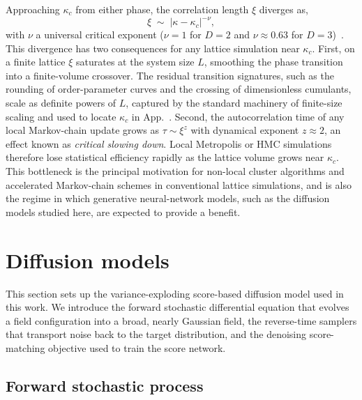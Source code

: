 \documentclass[reprint,twocolumn,superscriptaddress,preprintnumbers,amsmath,amssymb,aps,prd,floatfix]{revtex4-2}
\def\App#1{App.~\labelcref{#1}}
\begin{document}
Approaching $\kappa_c$ from either phase, the correlation length $\xi$ diverges as,
\begin{equation}
\xi \;\sim\; |\kappa-\kappa_c|^{-\nu},
\label{eq:xi_scaling}
\end{equation}
with $\nu$ a universal critical exponent ($\nu=1$ for $D=2$ and $\nu\approx 0.63$ for $D=3$)~\cite{Kleinert:2001ax}. This divergence has two consequences for any lattice simulation near $\kappa_c$. First, on a finite lattice $\xi$ saturates at the system size $L$, smoothing the phase transition into a finite-volume crossover. The residual transition signatures, such as the rounding of order-parameter curves and the crossing of dimensionless cumulants, scale as definite powers of $L$, captured by the standard machinery of finite-size scaling and used to locate $\kappa_c$ in \App{app:kappac}. Second, the autocorrelation time of any local Markov-chain update grows as $\tau\sim\xi^z$ with dynamical exponent $z\approx 2$, an effect known as \emph{critical slowing down}. Local Metropolis or HMC simulations therefore lose statistical efficiency rapidly as the lattice volume grows near $\kappa_c$. This bottleneck is the principal motivation for non-local cluster algorithms and accelerated Markov-chain schemes in conventional lattice simulations, and is also the regime in which generative neural-network models, such as the diffusion models studied here, are expected to provide a benefit.

\section{Diffusion models}
\label{sec:dm_framework}

This section sets up the variance-exploding score-based diffusion model used in this work. We introduce the forward stochastic differential equation that evolves a field configuration into a broad, nearly Gaussian field, the reverse-time samplers that transport noise back to the target distribution, and the denoising score-matching objective used to train the score network.

\subsection{Forward stochastic process}
\label{sec:dm_forward}
\end{document}
